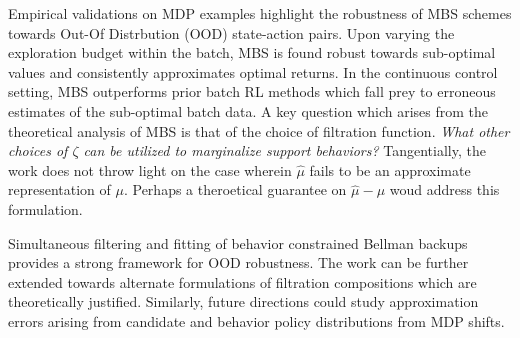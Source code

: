 \documentclass[11pt,letterpaper]{article}
\begin{document}
Empirical validations on MDP examples highlight the robustness of MBS schemes towards Out-Of Distrbution (OOD) state-action pairs. Upon varying the exploration budget within the batch, MBS is found robust towards sub-optimal values and consistently approximates optimal returns. In the continuous control setting, MBS outperforms prior batch RL methods which fall prey to erroneous estimates of the sub-optimal batch data. A key question which arises from the theoretical analysis of MBS is that of the choice of filtration function. \textit{What other choices of $\zeta$ can be utilized to marginalize support behaviors?} Tangentially, the work does not throw light on the case wherein $\hat{\mu}$ fails to be an approximate representation of $\mu$. Perhaps a theroetical guarantee on $\hat{\mu} - \mu$ woud address this formulation.

Simultaneous filtering and fitting of behavior constrained Bellman backups provides a strong framework for OOD robustness. The work can be further extended towards alternate formulations of filtration compositions which are theoretically justified. Similarly, future directions could study approximation errors arising from candidate and behavior policy distributions from MDP shifts.
\end{document}
